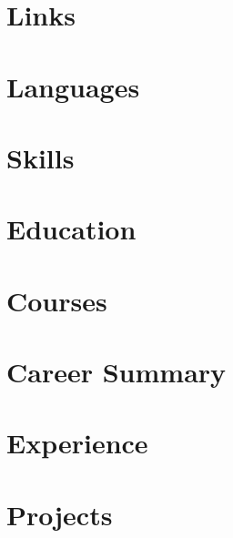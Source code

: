 \documentclass[]{deedy-resume-openfont}
\begin{document}
    \lastupdated
    \raggedright
    \begin{paracol}{2}
        \setlength{\columnsep}{8mm}

        \section{Links}             \label{sec:links}           
        \section{Languages}         \label{sec:languages}       
        \section{Skills}            \label{sec:skills}          
        \section{Education}         \label{sec:education}       
        \section{Courses}           \label{sec:courses}         

        \switchcolumn

        \section{Career Summary}   \label{sec:summary}          
        \section{Experience}        \label{sec:experience}      
        \section{Projects}          \label{sec:projects}        

    \end{paracol}
\end{document}
